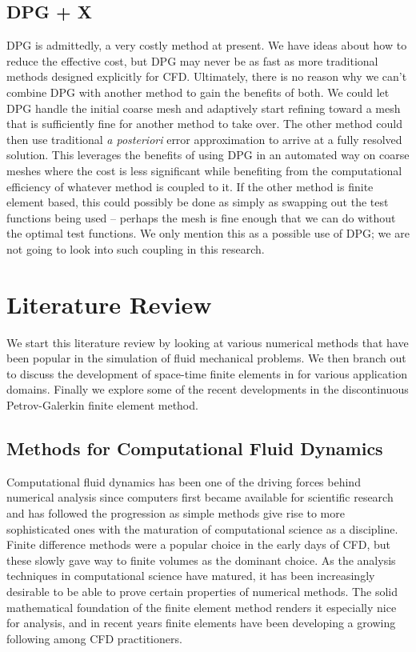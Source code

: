 \documentclass[Proposal.tex]{subfiles}
\begin{document}
\subsection{DPG + X}
DPG is admittedly, a very costly method at present. 
We have ideas about how to reduce the effective cost, but DPG may never be as fast as more traditional methods designed explicitly for CFD.
Ultimately, there is no reason why we can't combine DPG with another method to gain the benefits of both.
We could let DPG handle the initial coarse mesh and adaptively start refining toward a mesh that is sufficiently fine for another method to take over.
The other method could then use traditional \emph{a posteriori} error approximation to arrive at a fully resolved solution.
This leverages the benefits of using DPG in an automated way on coarse meshes where the cost is less significant while benefiting from the 
computational efficiency of whatever method is coupled to it.
If the other method is finite element based, this could possibly be done as simply as swapping out the test functions being used 
-- perhaps the mesh is fine enough that we can do without the optimal test functions.
We only mention this as a possible use of DPG; we are not going to look into such coupling in this research.

\section{Literature Review}
We start this literature review by looking at various numerical methods that have been popular in the simulation of fluid mechanical problems.
We then branch out to discuss the development of space-time finite elements in for various application domains.
Finally we explore some of the recent developments in the discontinuous Petrov-Galerkin finite element method.

\subsection{Methods for Computational Fluid Dynamics}
Computational fluid dynamics has been one of the driving forces behind numerical analysis since computers first became available for
scientific research and has followed the progression as simple methods give rise to more sophisticated ones with the maturation of computational
science as a discipline.
Finite difference methods were a popular choice in the early days of CFD, but these slowly gave way to finite volumes as the dominant choice.
As the analysis techniques in computational science have matured, it has been increasingly desirable to be able to prove certain properties of
numerical methods.
The solid mathematical foundation of the finite element method renders it especially nice for analysis, and in recent years finite elements have 
been developing a growing following among CFD practitioners.
\end{document}
